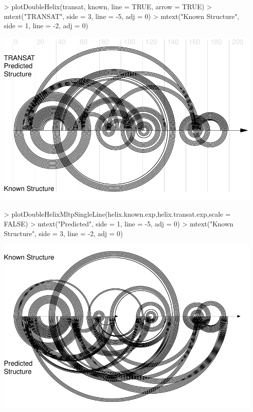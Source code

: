 \documentclass[letterpaper]{article}
\begin{document}
\begin{Schunk}
\begin{Sinput}
> plotDoubleHelix(transat, known, line = TRUE, arrow = TRUE)
> mtext("TRANSAT\nPredicted\nStructure", side = 3, line = -5, adj = 0)
> mtext("Known Structure", side = 1, line = -2, adj = 0)
\end{Sinput}
\end{Schunk}
\includegraphics{R4RNA-006}

\begin{Schunk}
\begin{Sinput}
> plotDoubleHelixMltpSingleLine(helix.known.exp,helix.transat.exp,scale = FALSE)
> mtext("Predicted\nStructure", side = 1, line = -5, adj = 0)
> mtext("Known Structure", side = 3, line = -2, adj = 0)
\end{Sinput}
\end{Schunk}
\includegraphics{R4RNA-007}
\end{document}

